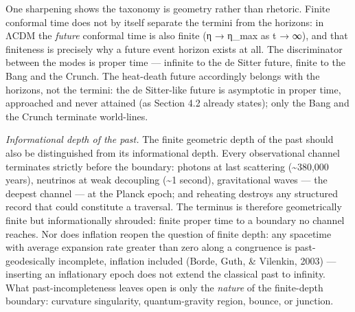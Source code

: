 \documentclass[
]{article}
\begin{document}
One sharpening shows the taxonomy is geometry rather than rhetoric.
Finite conformal time does not by itself separate the termini from the
horizons: in ΛCDM the \emph{future} conformal time is also finite (η →
η\_max as t → ∞), and that finiteness is precisely why a future event
horizon exists at all. The discriminator between the modes is proper
time --- infinite to the de Sitter future, finite to the Bang and the
Crunch. The heat-death future accordingly belongs with the horizons, not
the termini: the de Sitter-like future is asymptotic in proper time,
approached and never attained (as Section 4.2 already states); only the
Bang and the Crunch terminate world-lines.

\emph{Informational depth of the past.} The finite geometric depth of
the past should also be distinguished from its informational depth.
Every observational channel terminates strictly before the boundary:
photons at last scattering (\textasciitilde380,000 years), neutrinos at
weak decoupling (\textasciitilde1 second), gravitational waves --- the
deepest channel --- at the Planck epoch; and reheating destroys any
structured record that could constitute a traversal. The terminus is
therefore geometrically finite but informationally shrouded: finite
proper time to a boundary no channel reaches. Nor does inflation reopen
the question of finite depth: any spacetime with average expansion rate
greater than zero along a congruence is past-geodesically incomplete,
inflation included (Borde, Guth, \& Vilenkin, 2003) --- inserting an
inflationary epoch does not extend the classical past to infinity. What
past-incompleteness leaves open is only the \emph{nature} of the
finite-depth boundary: curvature singularity, quantum-gravity region,
bounce, or junction.
\end{document}

